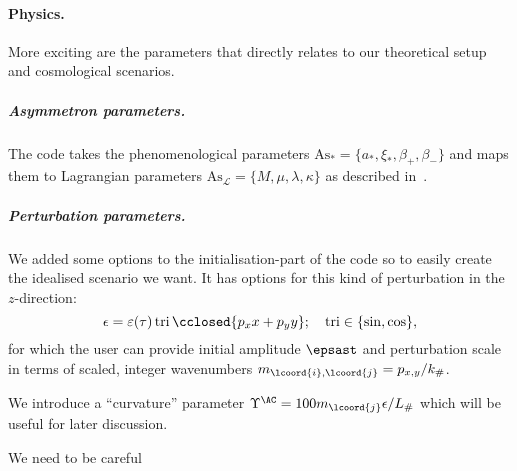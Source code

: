 \begin{draft}
    
    \paragraph{Physics.} %
    More exciting are the parameters that directly relates to our theoretical setup and cosmological scenarios. %
        \subparagraph{Asymmetron parameters.} %
        The code takes the phenomenological parameters $\mathrm{As}_\ast = \{a_\ast, \xi_\ast, \beta_+, \beta_- \}$ and maps them to Lagrangian parameters $\mathrm{As}_\mathcal{L} = \{ M, \mu, \lambda, \kappa \}$ as described in~.


        \subparagraph{Perturbation parameters.} %
        We added some options to the initialisation-part of the code so to easily create the idealised scenario we want. It has options for this kind of perturbation in the $z$-direction:
        \begin{equation}
            \epsilon = \varepsilon(\tau) \mathop{\mathrm{tri}}{\cclosed{ p_x x + p_y y }}; \quad \mathop{\mathrm{tri}} \in \{ \sin, \cos \},
        \end{equation}
        for which the user can provide initial amplitude $\epsast$ and perturbation scale in terms of scaled, integer wavenumbers $m_{\lcoord{i},\lcoord{j}} = p_{x,y} /k_\#$. 

        We introduce a ``curvature'' parameter $\Upsilon^{\AC}=  100m_{\lcoord{j}}\epsilon /L_\#$ which will be useful for later discussion. 


        
    We need to be careful \blahblah

\end{draft} 






